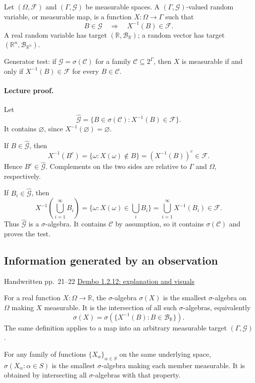 \documentclass[11pt,letterpaper]{article}
\newcommand{\lecturesection}[1]{\subsection{#1}}
\begin{document}
Let $(\Omega,\mathcal F)$ and $(\Gamma,\mathcal G)$ be measurable spaces. A $(\Gamma,\mathcal G)$-valued random variable, or measurable map, is a function $X:\Omega\to\Gamma$ such that \[B\in\mathcal G\quad\Longrightarrow\quad X^{-1}(B)\in\mathcal F.\] A real random variable has target $(\mathbb R,\mathcal B_{\mathbb R})$; a random vector has target $(\mathbb R^n,\mathcal B_{\mathbb R^n})$.

Generator test: if $\mathcal G=\sigma(\mathcal C)$ for a family $\mathcal C\subseteq2^\Gamma$, then $X$ is measurable if and only if $X^{-1}(B)\in\mathcal F$ for every $B\in\mathcal C$.

\paragraph{Lecture proof.}
Let \[\widehat{\mathcal G}=\{B\in\sigma(\mathcal C):X^{-1}(B)\in\mathcal F\}.\] It contains $\varnothing$, since $X^{-1}(\varnothing)=\varnothing$.

If $B\in\widehat{\mathcal G}$, then \[X^{-1}(B^c)=\{\omega:X(\omega)\notin B\}=(X^{-1}(B))^c\in\mathcal F.\] Hence $B^c\in\widehat{\mathcal G}$. Complements on the two sides are relative to $\Gamma$ and $\Omega$, respectively.

If $B_i\in\widehat{\mathcal G}$, then \[X^{-1}\!\left(\bigcup_{i=1}^{\infty}B_i\right)=\{\omega:X(\omega)\in\bigcup_iB_i\}=\bigcup_{i=1}^{\infty}X^{-1}(B_i)\in\mathcal F.\] Thus $\widehat{\mathcal G}$ is a $\sigma$-algebra. It contains $\mathcal C$ by assumption, so it contains $\sigma(\mathcal C)$ and proves the test.

\hypertarget{l3-s3}{}
\lecturesection{Information generated by an observation}
{\small\textcolor{lectureink}{Handwritten pp.\ 21--22} \quad \href{https://josephrbailey.com/probability/\#entry-1-2-12}{Dembo 1.2.12: explanation and visuals}}

For a real function $X:\Omega\to\mathbb R$, the $\sigma$-algebra $\sigma(X)$ is the smallest $\sigma$-algebra on $\Omega$ making $X$ measurable. It is the intersection of all such $\sigma$-algebras, equivalently \[\sigma(X)=\sigma(\{X^{-1}(B):B\in\mathcal B_{\mathbb R}\}).\] The same definition applies to a map into an arbitrary measurable target $(\Gamma,\mathcal G)$.

For any family of functions $\{X_\alpha\}_{\alpha\in S}$ on the same underlying space, $\sigma(X_\alpha:\alpha\in S)$ is the smallest $\sigma$-algebra making each member measurable. It is obtained by intersecting all $\sigma$-algebras with that property.
\end{document}
